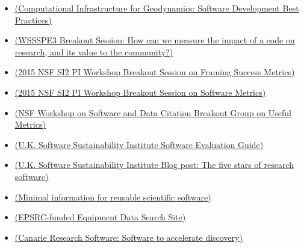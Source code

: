 \begin{itemize}

\item
\href{https://geodynamics.org/cig/dev/best-practices/}{(Computational Infrastructure for Geodynamics: Software Development Best Practices)}

\item
\href{https://docs.google.com/document/d/1cgUDH3RxrfsLotWhKKOrXUnaYFhrtjcV1TDRkFtwQKI/edit}{(WSSSPE3 Breakout Session: How can we measure the impact of a code on research, and its value to the community?)}

\item
\href{https://docs.google.com/document/d/10yj7MYEjvrg__t522XR41ogASYMp647-l-BpFTsqEV4/edit#heading=h.5lah0hp73q99}{(2015 NSF SI2 PI Workshop Breakout Session on Framing Success Metrics)}

\item
\href{https://docs.google.com/document/d/1uDim5bw8rBuubmtaUrz5Eh35NxzDgivmmdXhVzDs3tc/edit}{(2015 NSF SI2 PI Workshop Breakout Session on Software Metrics)}

\item
\href{https://docs.google.com/presentation/d/1PPLVL6uoOmisqnHTlwhsVKJBTFFK1IVzvr8FdEEIvAE/edit#slide=id.g5e66ec9f2_027}{(NSF Workshop on Software and Data Citation Breakout Group on Useful Metrics)}

\item
\href{http://www.software.ac.uk/software-evaluation-guide}{(U.K. Software Sustainability Institute Software Evaluation Guide)}

\item
\href{http://www.software.ac.uk/blog/2013-04-09-five-stars-research-software}{(U.K. Software Sustainability Institute Blog post: The five stars of research software)}

\item
\href{http://figshare.com/articles/Minimal_information_for_reusable_scientific_software/1112528}{(Minimal information for reusable scientific software)}

\item
\href{http://equipment.data.ac.uk/}{(EPSRC-funded Equipment Data Search Site)}

\item
\href{http://www.canarie.ca/software/}{(Canarie Research Software: Software to accelerate discovery)}


\end{itemize}
